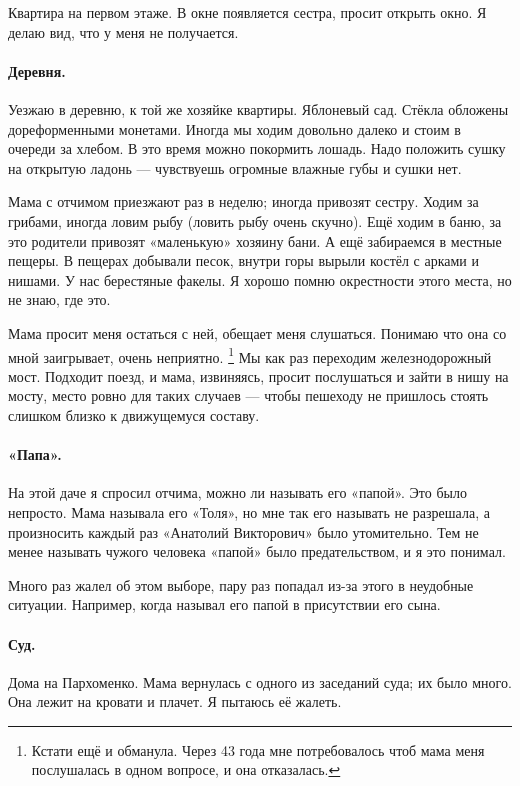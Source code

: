 \documentclass{book}
\begin{document}
Квартира на первом этаже.
В окне появляется сестра, просит открыть окно.
Я делаю вид, что у меня не получается.

\paragraph{Деревня.}
Уезжаю в деревню, к той же хозяйке квартиры.
Яблоневый сад.
Стёкла обложены дореформенными монетами.
Иногда мы ходим довольно далеко и стоим в очереди за хлебом.
В это время можно покормить лошадь.
Надо положить сушку на  открытую ладонь ---
чувствуешь огромные влажные губы и сушки нет.

Мама с отчимом приезжают раз в неделю; иногда привозят сестру.
Ходим за грибами, иногда ловим рыбу (ловить рыбу очень скучно).
Ещё ходим в баню, за это родители привозят «маленькую» хозяину бани.
А ещё забираемся в местные пещеры.
В пещерах добывали песок, внутри горы вырыли костёл с арками и нишами.
У нас берестяные факелы.
Я хорошо помню окрестности этого места, но не знаю, где это.

Мама просит меня остаться с ней, обещает меня слушаться.
Понимаю что она со мной заигрывает, очень неприятно.%
\footnote{Кстати ещё и обманула. Через 43 года мне потребовалось чтоб мама меня послушалась в одном вопросе, и она отказалась.}
Мы как раз переходим железнодорожный мост.
Подходит поезд, и мама, извиняясь, просит послушаться и зайти в нишу на мосту,
место ровно для таких случаев --- чтобы пешеходу не пришлось стоять слишком близко к движущемуся составу.

\paragraph{«Папа».}
На этой даче я спросил отчима, можно ли называть его «папой».
Это было непросто.
Мама называла его «Толя», но мне так его называть не разрешала, а произносить каждый раз «Анатолий Викторович» было утомительно.
Тем не менее называть чужого человека «папой» было предательством, и я это понимал.

Много раз жалел об этом выборе, пару раз попадал из-за этого в неудобные ситуации.
Например, когда называл его папой в присутствии его сына.

\paragraph{Суд.}
Дома на Пархоменко.
Мама вернулась с одного из заседаний суда;
их было много.
Она лежит на кровати и плачет.
Я пытаюсь её жалеть.
\end{document}
